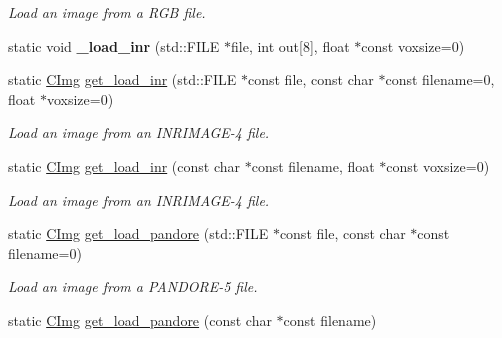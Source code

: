 \begin{DoxyCompactItemize}
\begin{DoxyCompactList}\small\item\em Load an image from a RGB file. \item\end{DoxyCompactList}\item 
\hypertarget{structcimg__library_1_1_c_img_ace5b0efa1467caec1bb0bca00a6358ca}{
static void {\bfseries \_\-load\_\-inr} (std::FILE $\ast$file, int out\mbox{[}8\mbox{]}, float $\ast$const voxsize=0)}
\label{structcimg__library_1_1_c_img_ace5b0efa1467caec1bb0bca00a6358ca}

\item 
\hypertarget{structcimg__library_1_1_c_img_a2c9ffc08d42b4756e03ef534f2a107bd}{
static \hyperlink{structcimg__library_1_1_c_img}{CImg} \hyperlink{structcimg__library_1_1_c_img_a2c9ffc08d42b4756e03ef534f2a107bd}{get\_\-load\_\-inr} (std::FILE $\ast$const file, const char $\ast$const filename=0, float $\ast$voxsize=0)}
\label{structcimg__library_1_1_c_img_a2c9ffc08d42b4756e03ef534f2a107bd}

\begin{DoxyCompactList}\small\item\em Load an image from an INRIMAGE-\/4 file. \item\end{DoxyCompactList}\item 
\hypertarget{structcimg__library_1_1_c_img_adc7ab95da200f83819a5b87a0b6174b5}{
static \hyperlink{structcimg__library_1_1_c_img}{CImg} \hyperlink{structcimg__library_1_1_c_img_adc7ab95da200f83819a5b87a0b6174b5}{get\_\-load\_\-inr} (const char $\ast$const filename, float $\ast$const voxsize=0)}
\label{structcimg__library_1_1_c_img_adc7ab95da200f83819a5b87a0b6174b5}

\begin{DoxyCompactList}\small\item\em Load an image from an INRIMAGE-\/4 file. \item\end{DoxyCompactList}\item 
\hypertarget{structcimg__library_1_1_c_img_a7eb5f1206085b6929c455b7f6c46ba50}{
static \hyperlink{structcimg__library_1_1_c_img}{CImg} \hyperlink{structcimg__library_1_1_c_img_a7eb5f1206085b6929c455b7f6c46ba50}{get\_\-load\_\-pandore} (std::FILE $\ast$const file, const char $\ast$const filename=0)}
\label{structcimg__library_1_1_c_img_a7eb5f1206085b6929c455b7f6c46ba50}

\begin{DoxyCompactList}\small\item\em Load an image from a PANDORE-\/5 file. \item\end{DoxyCompactList}\item 
\hypertarget{structcimg__library_1_1_c_img_a3f2c9c193baa14a640777242798301f0}{
static \hyperlink{structcimg__library_1_1_c_img}{CImg} \hyperlink{structcimg__library_1_1_c_img_a3f2c9c193baa14a640777242798301f0}{get\_\-load\_\-pandore} (const char $\ast$const filename)}
\label{structcimg__library_1_1_c_img_a3f2c9c193baa14a640777242798301f0}


\end{DoxyCompactItemize}
